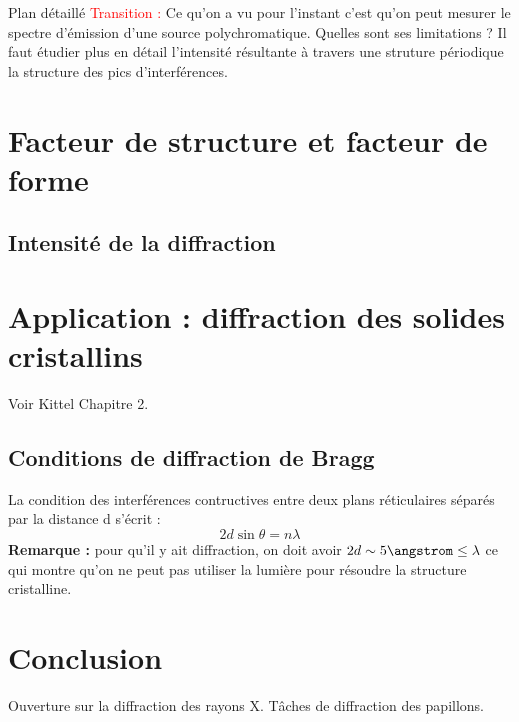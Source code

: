 \begin{reportBlock}{Plan détaillé}
  \textcolor{red}{Transition :} Ce qu'on a vu pour l'instant c'est qu'on peut mesurer le spectre d'émission d'une source polychromatique. Quelles sont ses limitations ? Il faut étudier plus en détail l'intensité résultante à travers une struture périodique la structure des pics d'interférences.

  \section{Facteur de structure et facteur de forme}
  \subsection{Intensité de la diffraction}

  \section{Application : diffraction des solides cristallins}
  Voir Kittel Chapitre 2.
  \subsection{Conditions de diffraction de Bragg}
  La condition des interférences contructives entre deux plans réticulaires séparés par la distance d s'écrit :
  \begin{equation}
      2d\sin{\theta} = n\lambda
  \end{equation}
  \textbf{Remarque :} pour qu'il y ait diffraction, on doit avoir $2d\sim 5\angstrom\leq\lambda$ ce qui montre qu'on ne peut pas utiliser la lumière pour résoudre la structure cristalline.


\section*{Conclusion}
Ouverture sur la diffraction des rayons X. Tâches de diffraction des papillons.
\end{reportBlock}




